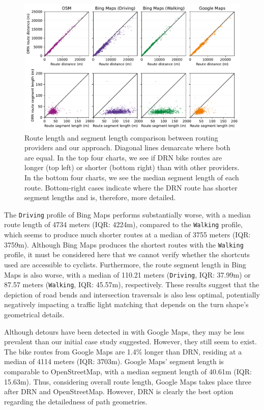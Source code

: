 \begin{figure}[t]
\centering 
\includegraphics[width=\linewidth]{images/routing-distance-comparison.pdf}
\caption{Route length and segment length comparison between routing providers and our approach. Diagonal lines demarcate where both are equal. In the top four charts, we see if DRN bike routes are longer (top left) or shorter (bottom right) than with other providers. In the bottom four charts, we see the median segment length of each route. Bottom-right cases indicate where the DRN route has shorter segment lengths and is, therefore, more detailed.}
\label{fig:routing-distance-comparison}
\end{figure}

The \texttt{Driving} profile of Bing Maps performs substantially worse, with a median route length of 4734 meters (IQR: 4224m), compared to the \texttt{Walking} profile, which seems to produce much shorter routes at a median of 3755 meters (IQR: 3759m). Although Bing Maps produces the shortest routes with the \texttt{Walking} profile, it must be considered here that we cannot verify whether the shortcuts used are accessible to cyclists. Furthermore, the route segment length in Bing Maps is also worse, with a median of 110.21 meters (\texttt{Driving}, IQR: 37.99m) or 87.57 meters (\texttt{Walking}, IQR: 45.57m), respectively. These results suggest that the depiction of road bends and intersection traversals is also less optimal, potentially negatively impacting a traffic light matching that depends on the turn shape's geometrical details. 

Although detours have been detected in  with Google Maps, they may be less prevalent than our initial case study suggested. However, they still seem to exist. The bike routes from Google Maps are 1.4\% longer than DRN, residing at a median of 4114 meters (IQR: 3703m). Google Maps' segment length is comparable to OpenStreetMap, with a median segment length of 40.61m (IQR: 15.63m). Thus, considering overall route length, Google Maps takes place three after DRN and OpenStreetMap. However, DRN is clearly the best option regarding the detailedness of path geometries.

